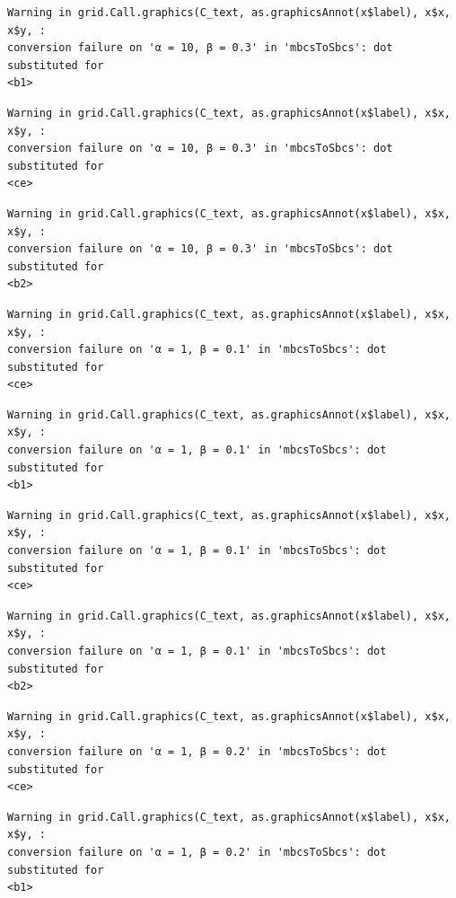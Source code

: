 \documentclass[
  spanish,
  a4paper,
]{scrreport}
\theoremstyle{plain}
\theoremstyle{definition}
\theoremstyle{definition}
\theoremstyle{remark}
\begin{document}
\begin{verbatim}
Warning in grid.Call.graphics(C_text, as.graphicsAnnot(x$label), x$x, x$y, :
conversion failure on 'α = 10, β = 0.3' in 'mbcsToSbcs': dot substituted for
<b1>
\end{verbatim}

\begin{verbatim}
Warning in grid.Call.graphics(C_text, as.graphicsAnnot(x$label), x$x, x$y, :
conversion failure on 'α = 10, β = 0.3' in 'mbcsToSbcs': dot substituted for
<ce>
\end{verbatim}

\begin{verbatim}
Warning in grid.Call.graphics(C_text, as.graphicsAnnot(x$label), x$x, x$y, :
conversion failure on 'α = 10, β = 0.3' in 'mbcsToSbcs': dot substituted for
<b2>
\end{verbatim}

\begin{verbatim}
Warning in grid.Call.graphics(C_text, as.graphicsAnnot(x$label), x$x, x$y, :
conversion failure on 'α = 1, β = 0.1' in 'mbcsToSbcs': dot substituted for
<ce>
\end{verbatim}

\begin{verbatim}
Warning in grid.Call.graphics(C_text, as.graphicsAnnot(x$label), x$x, x$y, :
conversion failure on 'α = 1, β = 0.1' in 'mbcsToSbcs': dot substituted for
<b1>
\end{verbatim}

\begin{verbatim}
Warning in grid.Call.graphics(C_text, as.graphicsAnnot(x$label), x$x, x$y, :
conversion failure on 'α = 1, β = 0.1' in 'mbcsToSbcs': dot substituted for
<ce>
\end{verbatim}

\begin{verbatim}
Warning in grid.Call.graphics(C_text, as.graphicsAnnot(x$label), x$x, x$y, :
conversion failure on 'α = 1, β = 0.1' in 'mbcsToSbcs': dot substituted for
<b2>
\end{verbatim}

\begin{verbatim}
Warning in grid.Call.graphics(C_text, as.graphicsAnnot(x$label), x$x, x$y, :
conversion failure on 'α = 1, β = 0.2' in 'mbcsToSbcs': dot substituted for
<ce>
\end{verbatim}

\begin{verbatim}
Warning in grid.Call.graphics(C_text, as.graphicsAnnot(x$label), x$x, x$y, :
conversion failure on 'α = 1, β = 0.2' in 'mbcsToSbcs': dot substituted for
<b1>
\end{verbatim}
\end{document}
